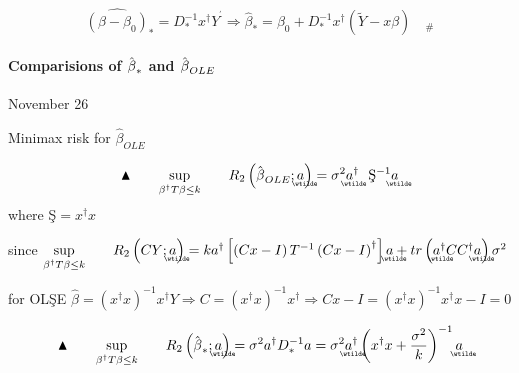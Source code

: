 \documentclass{article}
\begin{document}
\bigskip

\begin{equation*}
\widehat{\left( \beta -\beta _{0}\right) }_{\ast }=D_{\ast }^{-1}x^{\dagger
}Y^{^{\prime }}\Rightarrow \hat{\beta}_{\ast }=\beta _{0}+D_{\ast
}^{-1}x^{\dagger }\left( \tilde{Y}-x\beta \right) \quad _{\#}
\end{equation*}%
\qquad \qquad

\bigskip

\paragraph{Comparisions of $\hat{\protect\beta}_{\ast }$ and $\hat{\protect%
\beta}_{OLE}$}

November 26

Minimax risk for $\hat{\beta}_{OLE}$

\begin{equation}
\blacktriangle \qquad \underset{\beta ^{\dagger }T\beta \leq k}{\sup }\qquad
R_{2}\left( \hat{\beta}_{OLE};%
\underaccent{\wtilde}{a}%
\right) =\sigma ^{2}%
\underaccent{\wtilde}{a}%
^{\dagger }\text{\c{S}}^{-1}%
\underaccent{\wtilde}{a}%
\end{equation}%
where \c{S}$=x^{\dagger }x$

since $\underset{\beta ^{\dagger }T\beta \leq k}{\sup }\qquad R_{2}\left( CY;%
\underaccent{\wtilde}{a}%
\right) =ka^{\dagger }\left[ \left( Cx-I\right) T^{-1}\left( Cx-I\right)
^{\dagger }\right] 
\underaccent{\wtilde}{a}%
+tr\left( 
\underaccent{\wtilde}{a}%
^{\dagger }CC^{\dagger }%
\underaccent{\wtilde}{a}%
\right) \sigma ^{2}$

for OL\c{S}E $\hat{\beta}=\left( x^{\dagger }x\right) ^{-1}x^{\dagger
}Y\Rightarrow C=\left( x^{\dagger }x\right) ^{-1}x^{\dagger }\Rightarrow
Cx-I=\left( x^{\dagger }x\right) ^{-1}x^{\dagger }x-I=0$

\begin{equation}
\blacktriangle \qquad \underset{\beta ^{\dagger }T\beta \leq k}{\sup }\qquad
R_{2}\left( \hat{\beta}_{\ast };%
\underaccent{\wtilde}{a}%
\right) =\sigma ^{2}a^{\dagger }D_{\ast }^{-1}a=\sigma ^{2}%
\underaccent{\wtilde}{a}%
^{\dagger }\left( x^{\dagger }x+\frac{\sigma ^{2}}{k}\right) ^{-1}%
\underaccent{\wtilde}{a}%
\end{equation}
\end{document}
